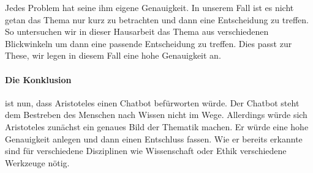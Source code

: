 \glqq Jedes Problem hat seine ihm eigene Genauigkeit\grqq. In unserem Fall ist es nicht getan das Thema nur kurz zu betrachten und dann eine Entscheidung zu treffen. So untersuchen wir in dieser Hausarbeit das Thema aus verschiedenen Blickwinkeln um dann eine passende Entscheidung zu treffen. Dies passt zur These, wir legen in diesem Fall eine hohe Genauigkeit an.

\paragraph{Die Konklusion} ist nun, dass Aristoteles einen Chatbot befürworten würde. Der Chatbot steht dem Bestreben des Menschen nach Wissen nicht im Wege. Allerdings würde sich Aristoteles zunächst ein genaues Bild der Thematik machen. Er würde eine hohe Genauigkeit anlegen und dann einen Entschluss fassen. Wie er bereits erkannte sind für verschiedene Disziplinen wie Wissenschaft oder Ethik verschiedene Werkzeuge nötig.    
